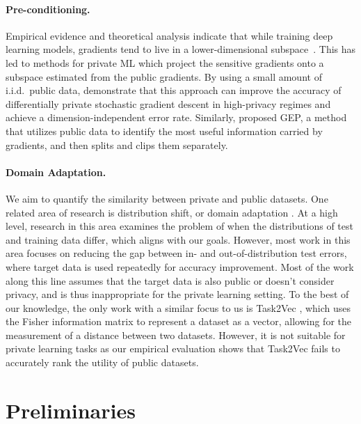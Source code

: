 \documentclass[11pt]{article}
\begin{document}
\paragraph{Pre-conditioning.} Empirical evidence and theoretical analysis indicate that while training deep learning models,  gradients tend to live in a lower-dimensional subspace~\cite{subspace1, subspace2, subspace3, aws, precondtheo}. This has led to methods for private ML which project the sensitive gradients onto a subspace estimated from the public gradients.
By using a small amount of i.i.d.\ public data, \cite{bypass} demonstrate that this approach can improve the accuracy of differentially private stochastic gradient descent in high-privacy regimes and achieve a dimension-independent error rate. Similarly, \cite{donot} proposed GEP, a method that utilizes public data to identify the most useful information carried by gradients, and then splits and clips them separately. 

\paragraph{Domain Adaptation.} We aim to quantify the similarity between private and public datasets. One related area of research is distribution shift, or domain adaptation \cite {distshiftsurvey, distshiftsurvey2, distshiftsurvey3, distshiftsurvey4, Ben-DavidBCKPV10, Ben-DavidBCP06, tent}. At a high level, research in this area examines the problem of when the distributions of test and training data differ, which aligns with our goals. However, most work in this area focuses on reducing the gap between in- and out-of-distribution test errors, where target data is used repeatedly for accuracy improvement. Most of the work along this line assumes that the target data is also public or doesn't consider privacy, and is thus inappropriate for the private learning setting. To the best of our knowledge, the only work with a similar focus to us is Task2Vec \cite{task2vec}, which uses the Fisher information matrix to represent a dataset as a vector, allowing for the measurement of a distance between two datasets. However, it is not suitable for private learning tasks as our empirical evaluation shows that Task2Vec fails to accurately rank the utility of public datasets.

\section{Preliminaries}
\label{Preliminaries}
\end{document}
